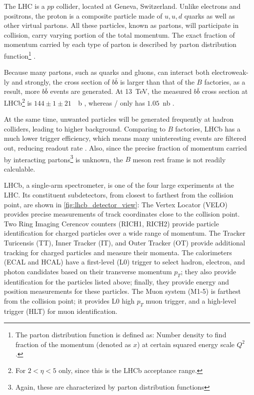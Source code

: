 The LHC is a $pp$ collider, located at Geneva, Switzerland.
Unlike electrons and positrons, the proton is a composite particle made of $u,
u, d$ quarks as well as other virtual partons.
All these particles, known as partons, will participate in collision, carry
varying portion of the total momentum.
The exact fraction of momentum carried by each type of parton is described by
parton distribution function\footnote{
    The parton distribution function is defined as:
    Number density to find fraction of the momentum (denoted as $x$) at certain
    squared energy scale $Q^2$.
} \cite{Ball:2014uwa}.

Because many partons, such as quarks and gluons, can interact both
electroweak-ly and strongly,
the cross section of $b \bar{b}$ is larger than that of the $B$ factories, as a
result, more $b \bar{b}$ events are generated.
At \SI{13}{TeV}, the measured $b \bar{b}$ cross section at LHCb\footnote{
    For $2 < \eta < 5$ only, since this is the LHCb acceptance range.
} is $144 \pm 1 \pm 21$~\si{\mu b} \cite{Aaij:2016avz}, whereas \BaBar/ only has
$1.05$~\si{nb} \cite{Harrison:1998yr}.

At the same time, unwanted particles will be generated frequently at hadron
colliders, leading to higher background.
Comparing to $B$ factories, LHCb has a much lower trigger efficiency, which
means many uninteresting events are filtered out, reducing readout
rate \cite{LHCb:2008}.
Also, since the precise fraction of momentum carried by interacting
partons\footnote{
    Again, these are characterized by parton distribution functions
} is unknown, the $B$ meson rest frame is not readily calculable.

LHCb, a single-arm spectrometer, is one of the four large experiments at the
LHC.
Its constituent subdetectors, from closest to farthest from the collision point,
are shown in \autoref{fig:lhcb_detector_view}:
The Vertex Locator (VELO) provides precise measurements of track coordinates
close to the collision point.
Two Ring Imaging Cerencov counters (RICH1, RICH2) provide particle
identification for charged particles over a wide range of momentum.
The Tracker Turicensis (TT), Inner Tracker (IT), and Outer Tracker (OT) provide
additional tracking for charged particles and measure their momenta.
The calorimeters (ECAL and HCAL) have a first-level (L0) trigger to select
hadron, electron, and photon candidates based on their transverse momentum
$p_T$;
they also provide identification for the particles listed above;
finally, they provide energy and position measurements for these particles.
The Muon system (M1-5) is farthest from the collision point;
it provides L0 high $p_T$ muon trigger, and a high-level trigger (HLT) for muon
identification.

